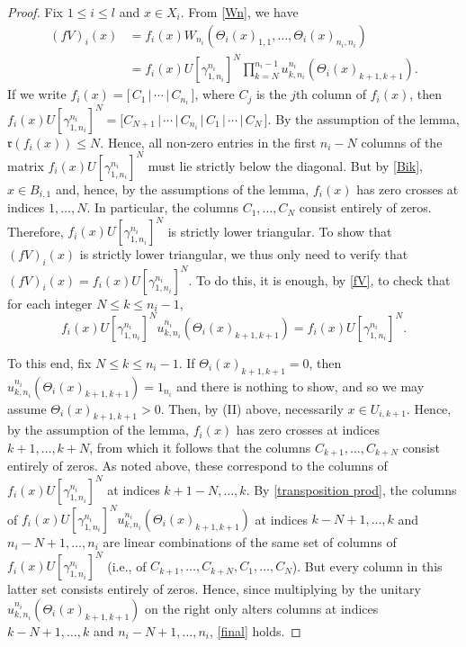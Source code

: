 \documentclass[12pt]{amsart}
\numberwithin{equation}{section}
\theoremstyle{definition}
\theoremstyle{remark}
\begin{document}
\begin{proof}
	Fix $1\leq i\leq  l $ and $x\in X_{i}$. From \autoref{Wn}, we have
	\begin{equation}
	\label{fV}
	\begin{aligned}
	(fV)_{i}(x)&=f_{i}(x)W_{n_{i}}(\Theta_{i}(x)_{1,1},\ldots,\Theta_{i}(x)_{n_{i},n_{i}})\\
	&=f_{i}(x)U[\gamma_{1,n_{i}}^{n_{i}}]^{N}\prod_{k=N}^{n_{i}-1}u^{n_{i}}_{k,n_{i}}(\Theta_{i}(x)_{k+1,k+1}).
	\end{aligned}
	\end{equation}
	If we write $f_{i}(x)=\big[\, C_{1}\, |\, \cdots\, |\, C_{n_{i}}\, \big]$, where $C_{j}$ is the $j$th column of $f_{i}(x)$, then $f_{i}(x)U[\gamma_{1,n_{i}}^{n_{i}}]^{N}=\big[C_{N+1}\, |\, \cdots\, |\, C_{n_{i}}\, |\, C_{1}\, |\, \cdots\, |\, C_{N}\, \big]$. By the assumption of the lemma, $\mathfrak{r}(f_{i}(x))\leq N$. Hence, all non-zero entries in the first $n_{i}-N$ columns of the matrix $f_{i}(x)U[\gamma_{1,n_{i}}^{n_{i}}]^{N}$ must lie strictly below the diagonal. But by \autoref{Bik}, $x\in B_{i,1}$ and, hence, by the assumptions of the lemma, $f_{i}(x)$ has zero crosses at indices $1,\ldots, N$. In particular, the columns $C_{1},\ldots,C_{N}$ consist entirely of zeros. Therefore, $f_{i}(x)U[\gamma_{1,n_{i}}^{n_{i}}]^{N}$ is strictly lower triangular. To show that $(fV)_{i}(x)$ is strictly lower triangular, we thus only need to verify that $(fV)_{i}(x)=f_{i}(x)U[\gamma_{1,n_{i}}^{n_{i}}]^{N}$. To do this, it is enough, by \autoref{fV}, to check that for each integer $N\leq k\leq n_{i}-1$, 
	\begin{equation}
	\label{final}
	f_{i}(x)U[\gamma_{1,n_{i}}^{n_{i}}]^{N}u^{n_{i}}_{k,n_{i}}(\Theta_{i}(x)_{k+1,k+1})=f_{i}(x)U[\gamma_{1,n_{i}}^{n_{i}}]^{N}.
	\end{equation}
	
	To this end, fix $N\leq k\leq n_{i}-1$. If $\Theta_{i}(x)_{k+1,k+1}=0$, then $u^{n_{i}}_{k,n_{i}}(\Theta_{i}(x)_{k+1,k+1})=1_{n_{i}}$ and there is nothing to show, and so we may assume $\Theta_{i}(x)_{k+1,k+1}>0$. Then, by (II) above, necessarily $x\in U_{i,k+1}$. Hence, by the assumption of the lemma, $f_{i}(x)$ has zero crosses at indices $k+1, \ldots,k+N$, from which it follows that the columns $C_{k+1},\ldots,C_{k+N}$ consist entirely of zeros. As noted above, these correspond to the columns of $f_{i}(x)U[\gamma_{1,n_{i}}^{n_{i}}]^{N}$ at indices $k+1-N,\ldots,k$. By \autoref{transposition prod}, the columns of $f_{i}(x)U[\gamma_{1,n_{i}}^{n_{i}}]^{N}u^{n_{i}}_{k,n_{i}}(\Theta_{i}(x)_{k+1,k+1})$ at indices $k-N+1,\ldots,k$ and $n_{i}-N+1,\ldots,n_{i}$ are linear combinations of the same set of columns of $f_{i}(x)U[\gamma_{1,n_{i}}^{n_{i}}]^{N}$ (i.e., of $C_{k+1},\ldots,C_{k+N},C_{1},\ldots,C_{N}$). But every column in this latter set consists entirely of zeros. Hence, since multiplying by the unitary $u^{n_{i}}_{k,n_{i}}(\Theta_{i}(x)_{k+1,k+1})$ on the right only alters columns at indices $k-N+1,\ldots,k$ and $n_{i}-N+1,\ldots,n_{i}$, \autoref{final} holds. 
	

\end{proof}
\end{document}
